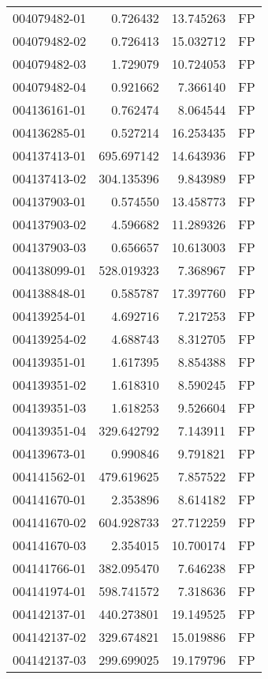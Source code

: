 \begin{tabular}{lrrl}
004079482-01 &    0.726432 &    13.745263 &   FP \\
004079482-02 &    0.726413 &    15.032712 &   FP \\
004079482-03 &    1.729079 &    10.724053 &   FP \\
004079482-04 &    0.921662 &     7.366140 &   FP \\
004136161-01 &    0.762474 &     8.064544 &   FP \\
004136285-01 &    0.527214 &    16.253435 &   FP \\
004137413-01 &  695.697142 &    14.643936 &   FP \\
004137413-02 &  304.135396 &     9.843989 &   FP \\
004137903-01 &    0.574550 &    13.458773 &   FP \\
004137903-02 &    4.596682 &    11.289326 &   FP \\
004137903-03 &    0.656657 &    10.613003 &   FP \\
004138099-01 &  528.019323 &     7.368967 &   FP \\
004138848-01 &    0.585787 &    17.397760 &   FP \\
004139254-01 &    4.692716 &     7.217253 &   FP \\
004139254-02 &    4.688743 &     8.312705 &   FP \\
004139351-01 &    1.617395 &     8.854388 &   FP \\
004139351-02 &    1.618310 &     8.590245 &   FP \\
004139351-03 &    1.618253 &     9.526604 &   FP \\
004139351-04 &  329.642792 &     7.143911 &   FP \\
004139673-01 &    0.990846 &     9.791821 &   FP \\
004141562-01 &  479.619625 &     7.857522 &   FP \\
004141670-01 &    2.353896 &     8.614182 &   FP \\
004141670-02 &  604.928733 &    27.712259 &   FP \\
004141670-03 &    2.354015 &    10.700174 &   FP \\
004141766-01 &  382.095470 &     7.646238 &   FP \\
004141974-01 &  598.741572 &     7.318636 &   FP \\
004142137-01 &  440.273801 &    19.149525 &   FP \\
004142137-02 &  329.674821 &    15.019886 &   FP \\
004142137-03 &  299.699025 &    19.179796 &   FP \\

\end{tabular}
